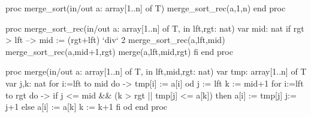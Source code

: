 \begin{pascallike}
proc merge_sort(in/out a: array[1..n] of T)
    merge_sort_rec(a,1,n)
end proc

proc merge_sort_rec(in/out a: array[1..n] of T, in lft,rgt: nat)
    var mid: nat
    if rgt > lft --> mid := (rgt+lft) `div` 2
        merge_sort_rec(a,lft,mid)
        merge_sort_rec(a,mid+1,rgt)
        merge(a,lft,mid,rgt)
    fi
end proc

proc merge(in/out a: array[1..n] of T, in lft,mid,rgt: nat)
    var tmp: array[1..n] of T
    var j,k: nat
    for i:=lft to mid do ->
        tmp[i] := a[i] 
    od
    j := lft
    k := mid+1
    for i:=lft to rgt do ->
        if j <= mid && (k > rgt || tmp[j] <= a[k])
            then a[i] := tmp[j]
                j:= j+1
            else a[i] := a[k]
                k := k+1
        fi
    od
end proc
\end{pascallike}